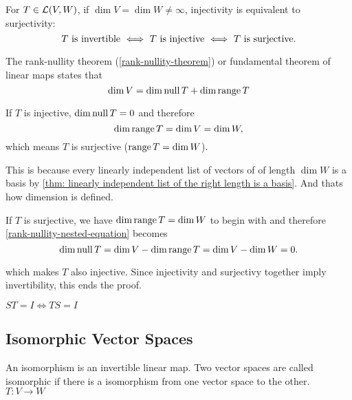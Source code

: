   \setcounter{thm}{64}
  \begin{thm} 
    \label{injectivity-is-equivalent-to-surjectivity}
    For $T\in \mathcal{L}(V,W)$, if $\dim V = \dim W \neq \infty$, injectivity is equivalent to surjectivity:
    \begin{equation}
        T$ is invertible $\iff$ $T$ is injective $\iff$ $T$ is surjective.$
    \end{equation}
  \end{thm}
  \begin{prf}
    The rank-nullity theorem (\ref{rank-nullity-theorem}) or fundamental theorem of linear maps states that
    \begin{equation}
      \label{rank-nullity-nested-equation}
      \dim V = \dim \operatorname{null} T + \dim \operatorname{range} T
    \end{equation}

    If $T$ is injective, $\dim \operatorname{null} T = 0$ and therefore
    \begin{equation}
      \dim \operatorname{range} T = \dim V = \dim W,
    \end{equation}
    which means $T$ is surjective ($\operatorname{range} T = \dim W$).

    This is because every linearly independent list of vectors of of length $\dim W$ is a basis by
    \ref{thm: linearly independent list of the right length is a basis}. And thats how dimension is defined.

    If $T$ is surjective, we have $\dim \operatorname{range} T = \dim W$ to begin with and therefore \eqref{rank-nullity-nested-equation} becomes
    \begin{equation}
      \dim \operatorname{null} T = \dim V - \dim \operatorname{range} T = \dim V - \dim W = 0.
    \end{equation}

    which makes $T$ also injective.
    Since injectivity and surjectivy together imply invertibility, this ends the proof.
  \end{prf}


  \setcounter{thm}{67}
  \begin{thm} 
    $ST = I \iff TS=I$
  \end{thm}

  \subsection{Isomorphic Vector Spaces}

  \begin{thm}
    An isomorphism is an invertible linear map. Two vector spaces are called isomorphic if there is a isomorphism from one vector space to the other. $T:V\to W$
  \end{thm}

